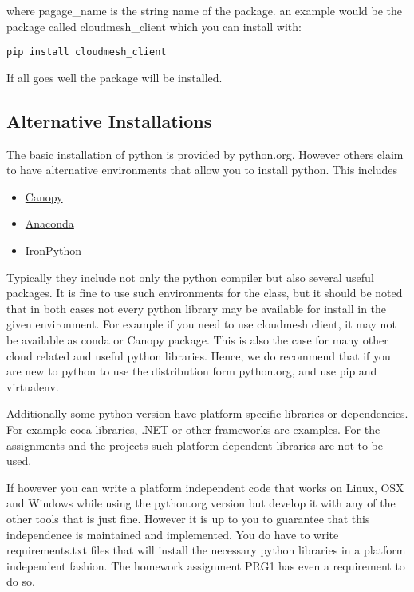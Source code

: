 where pagage\_name is the string name of the package. an example would
be the package called cloudmesh\_client which you can install with:

\begin{verbatim}
pip install cloudmesh_client
\end{verbatim}

If all goes well the package will be installed.

\subsection{Alternative Installations}\label{alternative-installations}

The basic installation of python is provided by python.org. However
others claim to have alternative environments that allow you to install
python. This includes

\begin{itemize}
\tightlist
\item
  \href{https://store.enthought.com/downloads/\#default}{Canopy}
\item
  \href{https://www.continuum.io/downloads}{Anaconda}
\item
  \href{http://ironpython.net/}{IronPython}
\end{itemize}

Typically they include not only the python compiler but also several
useful packages. It is fine to use such environments for the class, but
it should be noted that in both cases not every python library may be
available for install in the given environment. For example if you need
to use cloudmesh client, it may not be available as conda or Canopy
package. This is also the case for many other cloud related and useful
python libraries. Hence, we do recommend that if you are new to python
to use the distribution form python.org, and use pip and virtualenv.

Additionally some python version have platform specific libraries or
dependencies. For example coca libraries, .NET or other frameworks are
examples. For the assignments and the projects such platform dependent
libraries are not to be used.

If however you can write a platform independent code that works on
Linux, OSX and Windows while using the python.org version but develop it
with any of the other tools that is just fine. However it is up to you
to guarantee that this independence is maintained and implemented. You
do have to write requirements.txt files that will install the necessary
python libraries in a platform independent fashion. The homework
assignment PRG1 has even a requirement to do so.

